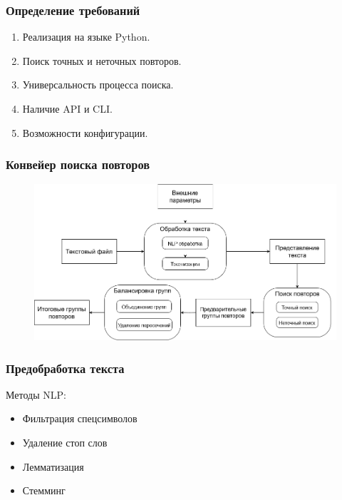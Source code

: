 \documentclass[aspectratio=169]{beamer}
\begin{document}
\begin{frame}\frametitle{Определение требований}
	\begin{enumerate}
		\item Реализация на языке Python.
		\item Поиск точных и неточных повторов.
		\item Универсальность процесса поиска.
		\item Наличие API и CLI.
		\item Возможности конфигурации.
	\end{enumerate}
\end{frame}


\begin{frame}\frametitle{Конвейер поиска повторов}
	\begin{figure}
		\includegraphics[scale=0.36]{../diploma/pictures/Flowchart.png}
	\end{figure}
\end{frame}



\begin{frame}\frametitle{Предобработка текста}
Методы NLP:
\begin{itemize}
	\item Фильтрация спецсимволов
	\item Удаление стоп слов
	\item Лемматизация
	\item Стемминг
\end{itemize}
\end{frame}


\end{document}
